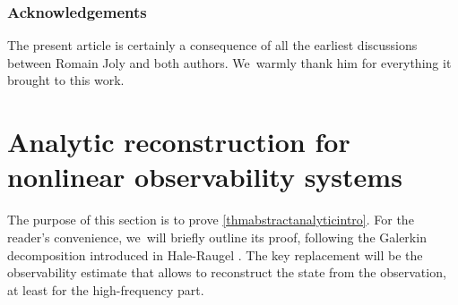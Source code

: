 \documentclass[10pt]{amsart}
\theoremstyle{definition}
\begin{document}
\subsubsection*{Acknowledgements} The present article is certainly a consequence of all the earliest discussions between Romain Joly and both authors. We~warmly thank him for everything it brought to this work.

\section{Analytic reconstruction for nonlinear observability systems}\label{sec:abstract-construction}

The purpose of this section is to prove \cref{thmabstractanalyticintro}. For the reader's convenience, we~will briefly outline its proof, following the Galerkin decomposition introduced in Hale-Raugel \cite{HR03}. The key replacement will be the observability estimate that allows to reconstruct the state from the observation, at least for the high-frequency part.
\end{document}
